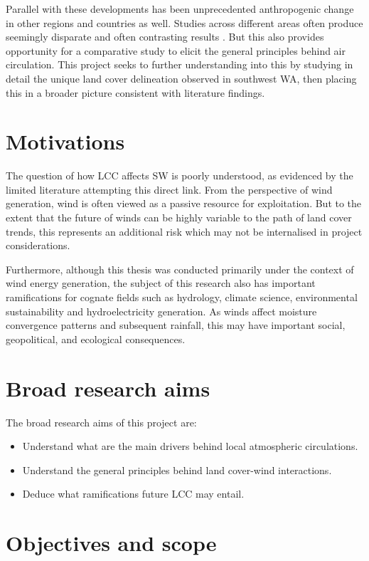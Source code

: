 Parallel with these developments has been unprecedented anthropogenic change in other regions and countries as well. Studies across different areas often produce seemingly disparate and often contrasting results \citep{xu2022}. But this also provides opportunity for a comparative study to elicit the general principles behind air circulation. This project seeks to further understanding into this by studying in detail the unique land cover delineation observed in southwest \ac{WA}, then placing this in a broader picture consistent with literature findings.

\section{Motivations}

The question of how \ac{LCC} affects \ac{SW} is poorly understood, as evidenced by the limited literature attempting this direct link. From the perspective of wind generation, wind is often viewed as a passive resource for exploitation. But to the extent that the future of winds can be highly variable to the path of land cover trends, this represents an additional risk which may not be internalised in project considerations.

Furthermore, although this thesis was conducted primarily under the context of wind energy generation, the subject of this research also has important ramifications for cognate fields such as hydrology, climate science, environmental sustainability and hydroelectricity generation. As winds affect moisture convergence patterns and subsequent rainfall, this may have important social, geopolitical, and ecological consequences.

\section{Broad research aims}

The broad research aims of this project are:
\begin{itemize}
	\item Understand what are the main drivers behind local atmospheric circulations.
	\item Understand the general principles behind land cover-wind interactions.
	\item Deduce what ramifications future \ac{LCC} may entail.
\end{itemize}

\section{Objectives and scope}

